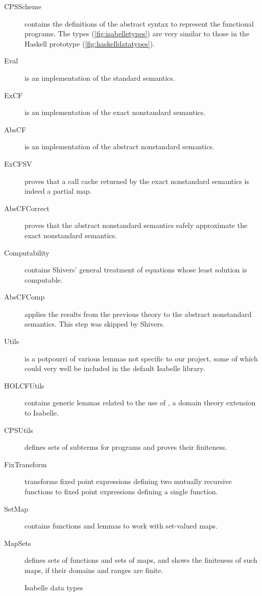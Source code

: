 \documentclass[a4paper,parskip=half,BCOR=8mm,DIV=calc,12pt]{scrbook}
\begin{document}
\begin{description}
\setlength\parskip{0pt}
\item[CPSScheme] contains the definitions of the abstract syntax to represent the functional programs. The types (\vref{fig:isabelletypes}) are very similar to those in the Haskell prototype (\vref{fig:haskelldatatypes}).
\item[Eval] is an implementation of the standard semantics.
\item[ExCF] is an implementation of the exact nonstandard semantics.
\item[AbsCF] is an implementation of the abstract nonstandard semantics.
\vspace{1em}
\item[ExCFSV] proves that a call cache returned by the exact nonstandard semantics is indeed a partial map.
\item[AbsCFCorrect] proves that the abstract nonstandard semantics safely approximate the exact nonstandard semantics.
\item[Computability] contains Shivers’ general treatment of equations whose least solution is computable.
\item[AbsCFComp] applies the results from the previous theory to the abstract nonstandard semantics. This step was skipped by Shivers.
\vspace{1em}
\item[Utils] is a potpourri of various lemmas not specific to our project, some of which could very well be included in the default Isabelle library.
\item[HOLCFUtils] contains generic lemmas related to the use of , a domain theory extension to Isabelle.
\item[CPSUtils] defines sets of subterms for programs and proves their finiteness.
\item[FixTransform] transforms fixed point expressions defining two mutually recursive functions to fixed point expressions defining a single function.
\item[SetMap] contains functions and lemmas to work with set-valued maps.
\item[MapSets] defines sets of functions and sets of maps, and shows the finiteness of such maps, if their domains and ranges are finite.
\end{description}

\begin{figure}
\begin{framed}

\end{framed}
\caption{Isabelle data types}
\label{fig:isabelletypes}
\end{figure}
\end{document}
